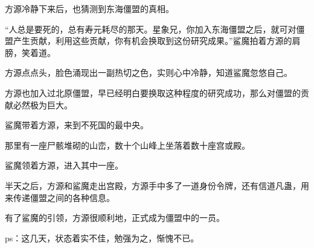 \begin{this_body}
方源冷静下来后，也猜测到东海僵盟的真相。

“人总是要死的，总有寿元耗尽的那天。星象兄，你加入东海僵盟之后，就可对僵盟产生贡献，利用这些贡献，你有机会换取到这份研究成果。”鲨魔拍着方源的肩膀，笑着道。

方源点点头，脸色涌现出一副热切之色，实则心中冷静，知道鲨魔忽悠自己。

方源也加入过北原僵盟，早已经明白要换取这种程度的研究成功，那么对僵盟的贡献必然极为巨大。

鲨魔带着方源，来到不死国的最中央。

那里有一座尸骸堆砌的山峦，数十个山峰上坐落着数十座宫或殿。

鲨魔领着方源，进入其中一座。

半天之后，方源和鲨魔走出宫殿，方源手中多了一道身份令牌，还有信道凡蛊，用来传递僵盟之间的各种信息。

有了鲨魔的引领，方源很顺利地，正式成为僵盟中的一员。

ps：这几天，状态着实不佳，勉强为之，惭愧不已。

\end{this_body}

